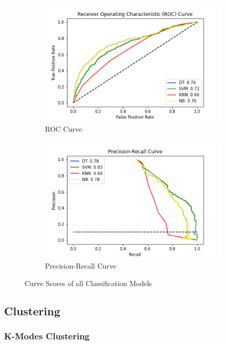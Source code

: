 \documentclass[11pt]{article}
\begin{document}
\begin{figure}[ht]
\begin{subfigure}{0.5\textwidth}
\includegraphics[scale=0.45]{roc_all.png} 
\caption{ROC Curve}
\label{fig:rocAll}
\end{subfigure}
\begin{subfigure}{0.5\textwidth}
\includegraphics[scale=0.45]{prs_all.png}
\caption{Precision-Recall Curve}
\label{fig:prsAll}
\end{subfigure}
\label{fig:csAll}
\caption{Curve Scores of all Classification Models}
\end{figure}

\clearpage
\subsection{Clustering}
\subsubsection{K-Modes Clustering}
\end{document}
